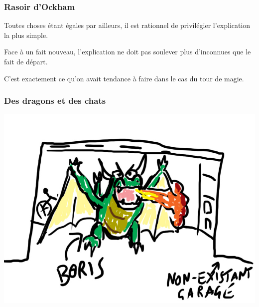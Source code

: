 \documentclass{beamer}
\begin{document}
\begin{frame}[plain]
    \frametitle{Rasoir d'Ockham}

    Toutes choses étant égales par ailleurs, il est rationnel de privilégier l'explication la plus simple.\pause

    \vspace{1cm}

    Face à un fait nouveau, l'explication ne doit pas soulever plus d'inconnues que le fait de départ.\pause

    \vspace{1cm}

    C'est exactement ce qu'on avait tendance à faire dans le cas du tour de magie.



\end{frame}

\begin{frame}[plain]
    \frametitle{Des dragons et des chats}




\end{frame}

\begin{frame}[plain]

    \vspace{-1cm}\centering\includegraphics[scale=.4]{images/dragon.jpg}

\end{frame}
\end{document}
